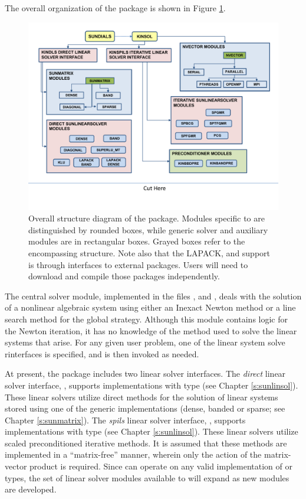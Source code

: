The overall organization of the {\kinsol} package is shown in Figure
\ref{f:kinorg}.
\begin{figure}[htb]
{\centerline{\includegraphics[width=\textwidth]{kinorg}}}
\caption [Overall structure diagram of the KINSOL package]
{Overall structure diagram of the {\kinsol} package.
  Modules specific to {\kinsol} are distinguished by rounded boxes, while
  generic solver and auxiliary modules are in rectangular boxes.
  Grayed boxes refer to the encompassing {\sundials} structure.
  Note also that the LAPACK, {\klu} and {\superlumt} support is
  through interfaces to external packages. 
  Users will need to download and compile those packages independently.}
\label{f:kinorg}
\end{figure}
The central solver module, implemented in the files
,  and , deals with the solution
of a nonlinear algebraic system using either an Inexact Newton method or a
line search method for the global strategy. Although this module contains logic
for the Newton iteration, it has no knowledge of the method used to solve the
linear systems that arise. For any given user problem, one of the linear system
solve rinterfaces is specified, and is then invoked as needed.

At present, the package includes two linear solver interfaces.  The
{\em direct} linear solver interface, {\kindls}, supports {\sunlinsol}
implementations with type  (see Chapter
\ref{s:sunlinsol}).  These linear solvers utilize direct methods for
the solution of linear systems stored using one of the {\sundials} generic
{\sunmatrix} implementations (dense, banded or sparse; see
Chapter \ref{s:sunmatrix}).  
The {\em spils} linear solver interface, {\kinspils}, supports
{\sunlinsol} implementations with type 
(see Chapter \ref{s:sunlinsol}).  These linear solvers utilize scaled
preconditioned iterative methods.  It is assumed that these methods
are implemented in a ``matrix-free'' manner, wherein only the action
of the matrix-vector product is required.  Since {\kinsol} can
operate on any valid {\sunlinsol} implementation of
 or  types, the set of
linear solver modules available to {\kinsol} will expand as new
{\sunlinsol} modules are developed.

